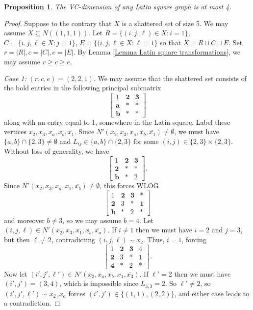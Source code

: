 \documentclass[10pt,a4paper]{amsart}
\newtheorem{prop}{Proposition}
\begin{document}
\begin{prop}
    The VC-dimension of any Latin square graph is at most 4.
\end{prop}

\begin{proof}
    Suppose to the contrary that $X$ is a shattered set of size 5. We may assume $X\subseteq N((1,1,1))$. Let $R=\{(i,j,\ell)\in X:i=1\}$, $C=\{i,j,\ell\in X:j=1\}$, $E=\{(i,j,\ell\in X:\ell=1\}$ so that $X=R\sqcup C\sqcup E$. Set $r=|R|,c=|C|,e=|E|$. By Lemma \ref{Lemma Latin square transformations}, we may assume $r\ge c\ge e$.

    \textit{Case 1:} $(r,c,e)=(2,2,1)$. We may assume that the shattered set consists of the bold entries in the following principal submatrix
    $$\begin{bmatrix}
        1&\textbf{2}&\textbf{3}\\
        \mathbf{a}&*&*\\
        \mathbf{b}&*&*
    \end{bmatrix}$$
    along with an entry equal to 1, somewhere in the Latin square. Label these vertices $x_2,x_3,x_a,x_b,x_1$. Since $N'(x_2,x_3,x_a,x_b,\overline{x_1})\ne\emptyset$, we must have $\{a,b\}\cap\{2,3\}\ne\emptyset$ and $L_{ij}\in\{a,b\}\cap\{2,3\}$ for some $(i,j)\in\{2,3\}\times\{2,3\}$. Without loss of generality, we have
    $$\begin{bmatrix}
        1&\textbf{2}&\textbf{3}\\
        \mathbf{2}&*&*\\
        \mathbf{b}&*&2
    \end{bmatrix}.$$
    Since $N'(x_2,x_3,x_a,x_1,\overline{x_b})\ne\emptyset$, this forces WLOG
        $$\begin{bmatrix}
        1&\textbf{2}&\textbf{3}&*\\
        \mathbf{2}&3&*&\mathbf{1}\\
        \mathbf{b}&*&2&*
    \end{bmatrix}$$
    and moreover $b\ne 3$, so we may assume $b=4$. Let $(i,j,\ell)\in N'(x_2,x_3,x_1,x_b,\overline{x_a})$. If $i\ne 1$ then we must have $i=2$ and $j=3$, but then $\ell\ne 2$, contradicting $(i,j,\ell)\sim x_2$. Thus, $i=1$, forcing
      $$\begin{bmatrix}
        1&\textbf{2}&\textbf{3}&4\\
        \mathbf{2}&3&*&\mathbf{1}\\
        \mathbf{4}&*&2&*
    \end{bmatrix}.$$
    Now let $(i',j',\ell')\in N'(x_2,x_a,x_b,x_1,\overline{x_3})$. If $\ell'=2$ then we must have $(i',j')=(3,4)$, which is impossible since $L_{3,3}=2$. So $\ell'\ne 2$, so $(i',j',\ell')\sim x_2,x_a$ forces $(i',j')\in\{(1,1),(2,2)\}$, and either case leads to a contradiction.


\end{proof}
\end{document}
